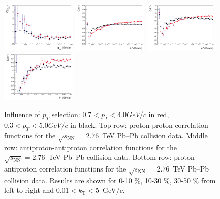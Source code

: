 \begin{figure}
  \includegraphics[width=0.32\textwidth]{cmp_dcatpconly11h_pt0745_pt035_cen4/APAP}
  \includegraphics[width=0.32\textwidth]{cmp_dcatpconly11h_pt0745_pt035_cen0/PAP}
  \includegraphics[width=0.32\textwidth]{cmp_dcatpconly11h_pt0745_pt035_cen2/PAP}
  \includegraphics[width=0.32\textwidth]{cmp_dcatpconly11h_pt0745_pt035_cen4/PAP}
  \caption{{Influence of $p_T$ selection: $0.7<p_T<4.0 GeV/c$ in red,  $0.3<p_T<5.0 GeV/c$ in black}. Top row: proton-proton correlation functions for the $\sqrt{s_{\mathrm{NN}}}=2.76$~TeV Pb--Pb collision data. Middle row: antiproton-antiproton correlation functions for the $\sqrt{s_{\mathrm{NN}}}=2.76$~TeV Pb--Pb collision data. Bottom row: proton-antiproton correlation functions for the $\sqrt{s_{\mathrm{NN}}}=2.76$~TeV Pb--Pb collision data. Results are shown for 0-10 $\%$, 10-30 $\%$,  30-50 $\%$ from left to right and $0.01 < k_{\mathrm{T}}<5$~GeV/$c$.}
  \label{cf_pt035_pt074}
\end{figure}



